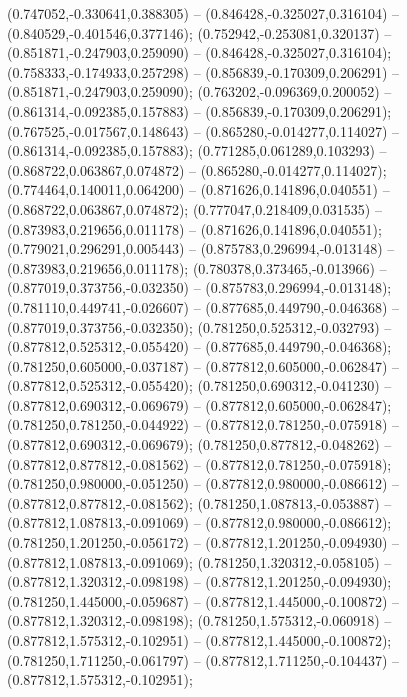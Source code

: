  (0.747052,-0.330641,0.388305) -- (0.846428,-0.325027,0.316104) -- (0.840529,-0.401546,0.377146);
 (0.752942,-0.253081,0.320137) -- (0.851871,-0.247903,0.259090) -- (0.846428,-0.325027,0.316104);
 (0.758333,-0.174933,0.257298) -- (0.856839,-0.170309,0.206291) -- (0.851871,-0.247903,0.259090);
 (0.763202,-0.096369,0.200052) -- (0.861314,-0.092385,0.157883) -- (0.856839,-0.170309,0.206291);
 (0.767525,-0.017567,0.148643) -- (0.865280,-0.014277,0.114027) -- (0.861314,-0.092385,0.157883);
 (0.771285,0.061289,0.103293) -- (0.868722,0.063867,0.074872) -- (0.865280,-0.014277,0.114027);
 (0.774464,0.140011,0.064200) -- (0.871626,0.141896,0.040551) -- (0.868722,0.063867,0.074872);
 (0.777047,0.218409,0.031535) -- (0.873983,0.219656,0.011178) -- (0.871626,0.141896,0.040551);
 (0.779021,0.296291,0.005443) -- (0.875783,0.296994,-0.013148) -- (0.873983,0.219656,0.011178);
 (0.780378,0.373465,-0.013966) -- (0.877019,0.373756,-0.032350) -- (0.875783,0.296994,-0.013148);
 (0.781110,0.449741,-0.026607) -- (0.877685,0.449790,-0.046368) -- (0.877019,0.373756,-0.032350);
 (0.781250,0.525312,-0.032793) -- (0.877812,0.525312,-0.055420) -- (0.877685,0.449790,-0.046368);
 (0.781250,0.605000,-0.037187) -- (0.877812,0.605000,-0.062847) -- (0.877812,0.525312,-0.055420);
 (0.781250,0.690312,-0.041230) -- (0.877812,0.690312,-0.069679) -- (0.877812,0.605000,-0.062847);
 (0.781250,0.781250,-0.044922) -- (0.877812,0.781250,-0.075918) -- (0.877812,0.690312,-0.069679);
 (0.781250,0.877812,-0.048262) -- (0.877812,0.877812,-0.081562) -- (0.877812,0.781250,-0.075918);
 (0.781250,0.980000,-0.051250) -- (0.877812,0.980000,-0.086612) -- (0.877812,0.877812,-0.081562);
 (0.781250,1.087813,-0.053887) -- (0.877812,1.087813,-0.091069) -- (0.877812,0.980000,-0.086612);
 (0.781250,1.201250,-0.056172) -- (0.877812,1.201250,-0.094930) -- (0.877812,1.087813,-0.091069);
 (0.781250,1.320312,-0.058105) -- (0.877812,1.320312,-0.098198) -- (0.877812,1.201250,-0.094930);
 (0.781250,1.445000,-0.059687) -- (0.877812,1.445000,-0.100872) -- (0.877812,1.320312,-0.098198);
 (0.781250,1.575312,-0.060918) -- (0.877812,1.575312,-0.102951) -- (0.877812,1.445000,-0.100872);
 (0.781250,1.711250,-0.061797) -- (0.877812,1.711250,-0.104437) -- (0.877812,1.575312,-0.102951);
